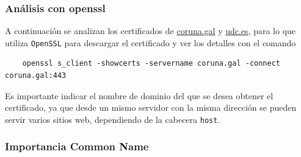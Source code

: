 \subsubsection{Análisis con openssl}

A continuación se analizan los certificados de \url{coruna.gal} y \url{udc.es}, para lo que utiliza \texttt{OpenSSL} para descargar el certificado y ver los detalles con el comando

\begin{verbatim}
    openssl s_client -showcerts -servername coruna.gal -connect coruna.gal:443
\end{verbatim}

Es importante indicar el nombre de dominio del que se desea obtener el certificado, ya que desde un mismo servidor con la misma dirección se pueden servir varios sitios web, dependiendo de la cabecera \texttt{host}.

\subsubsection{Importancia Common Name}
